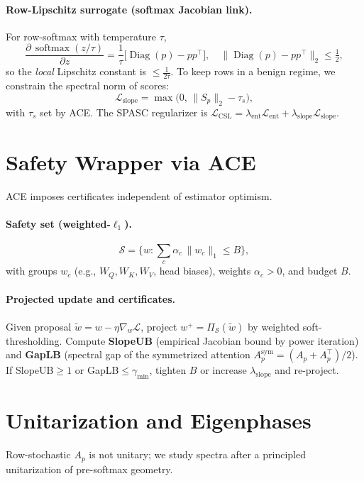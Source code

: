 \documentclass[11pt]{article}
\newcommand{\Diag}{\operatorname{Diag}}
\newcommand{\softmax}{\operatorname{softmax}}
\theoremstyle{definition}
\theoremstyle{remark}
\begin{document}
\paragraph{Row-Lipschitz surrogate (softmax Jacobian link).}
For row-softmax with temperature $\tau$,
\begin{equation}
  \frac{\partial\,\softmax(z/\tau)}{\partial z} = \frac{1}{\tau}\big[\Diag(p) - pp^\top\big],\quad \big\|\Diag(p) - pp^\top\big\|_2 \le \tfrac{1}{2},
\end{equation}
so the \emph{local} Lipschitz constant is $\le \tfrac{1}{2\tau}$. To keep rows in a benign regime, we constrain the spectral norm of scores:
\begin{equation}
  \mathcal{L}_{\mathrm{slope}} = \max\big(0,\,\|S_p\|_2 - \tau_s\big),
\end{equation}
with $\tau_s$ set by ACE. The SPASC regularizer is $\mathcal{L}_{\mathrm{CSL}}=\lambda_{\mathrm{ent}}\mathcal{L}_{\mathrm{ent}}+\lambda_{\mathrm{slope}}\mathcal{L}_{\mathrm{slope}}$.

\section{Safety Wrapper via ACE}
ACE imposes certificates independent of estimator optimism.
\paragraph{Safety set (weighted-$\ell_1$).}
\begin{equation}
  \mathcal{S}=\Big\{w:\sum_c \alpha_c\,\|w_c\|_1\le B\Big\},
\end{equation}
with groups $w_c$ (e.g., $W_Q,W_K,W_V$, head biases), weights $\alpha_c>0$, and budget $B$.
\paragraph{Projected update and certificates.}
Given proposal $\tilde w = w - \eta\nabla_w \mathcal{L}$, project $w^+=\Pi_{\mathcal{S}}(\tilde w)$ by weighted soft-thresholding. Compute \textbf{SlopeUB} (empirical Jacobian bound by power iteration) and \textbf{GapLB} (spectral gap of the symmetrized attention $A_p^{\mathrm{sym}}=(A_p+A_p^\top)/2$). If SlopeUB$\ge1$ or GapLB$\le\gamma_{\min}$, tighten $B$ or increase $\lambda_{\mathrm{slope}}$ and re-project.

\section{Unitarization and Eigenphases}
Row-stochastic $A_p$ is not unitary; we study spectra after a principled unitarization of pre-softmax geometry.
\end{document}
